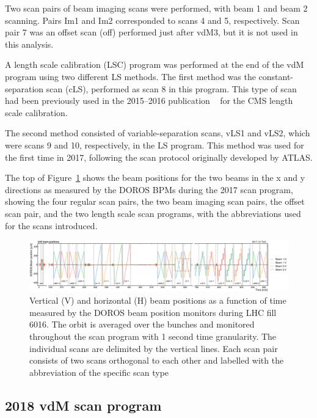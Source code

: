 Two scan pairs of beam imaging scans were performed, with beam 1 and beam 2 scanning. Pairs Im1 and Im2 corresponded to scans 4 and 5, respectively. Scan pair 7 was an offset scan (off) performed just after vdM3, but it is not used in this analysis.  

A length scale calibration (LSC) program was performed at the end of the vdM program using two different LS methods. The first method was the constant-separation scan (cLS), performed as scan 8 in this program. This type of scan had been previously used in the 2015–2016 publication  ~\citep{lumi_precise_2015_2016} for the CMS length scale calibration.

The second method consisted of variable-separation scans, vLS1 and vLS2, which were scans 9 and 10, respectively, in the LS program. This method was used for the first time in 2017, following the scan protocol originally developed by ATLAS.  

The top of Figure~\ref{BeamPosition_2017} shows the beam positions for the two beams in the x and y directions as measured by the DOROS BPMs during the 2017 scan program, showing the four regular scan pairs, the two beam imaging scan pairs, the offset scan pair, and the two length scale scan programs, with the abbreviations used for the scans introduced.  

  \begin{figure}[h]
    \hspace{-.4cm}
    \includegraphics[scale=.17]{Chapter3/BeamPosition/doros_vs_time_6016.pdf}
    \caption[Doros]{ Vertical (V) and horizontal (H) beam positions as a function of time measured by the DOROS beam position monitors during LHC fill 6016. The orbit is averaged over the bunches and monitored throughout the scan program with 1 second time granularity. The individual scans are delimited by the vertical lines. Each scan pair consists of two scans orthogonal to each other and labelled with the abbreviation of the specific scan type}
    \label{BeamPosition_2017}
  \end{figure}


\subsection{2018 vdM scan program}
\label{2018 vdM scan program}

